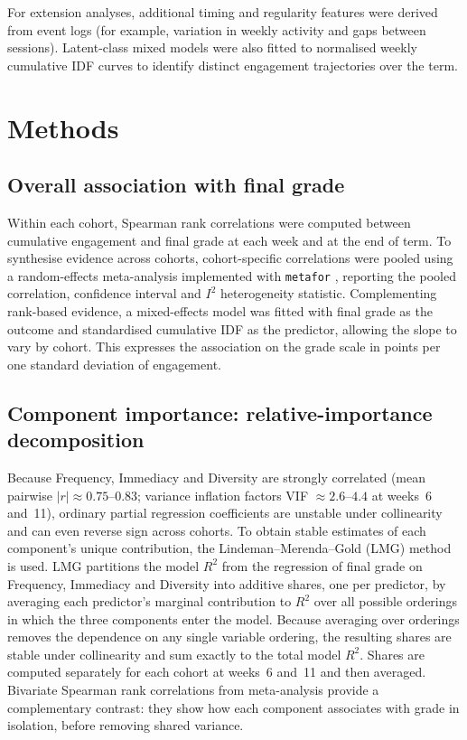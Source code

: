 \documentclass[11pt,a4paper]{article}
\begin{document}
For extension analyses, additional timing and regularity features were derived
from event logs (for example, variation in weekly activity and gaps between
sessions). Latent-class mixed models were also fitted to normalised weekly
cumulative IDF curves to identify distinct engagement trajectories over the term.

\section{Methods}

\subsection{Overall association with final grade}
Within each cohort, Spearman rank correlations were computed between cumulative
engagement and final grade at each week and at the end of term. To synthesise
evidence across cohorts, cohort-specific correlations were pooled using a
random-effects meta-analysis implemented with \texttt{metafor}
\citep{viechtbauer2010}, reporting the pooled correlation, confidence interval
and $I^2$ heterogeneity statistic. Complementing rank-based evidence, a
mixed-effects model was fitted with final grade as the outcome and standardised
cumulative IDF as the predictor, allowing the slope to vary by cohort. This
expresses the association on the grade scale in points per one standard deviation
of engagement.

\subsection{Component importance: relative-importance decomposition}
Because Frequency, Immediacy and Diversity are strongly correlated (mean pairwise
$|r| \approx 0.75$--$0.83$; variance inflation factors VIF $\approx 2.6$--$4.4$
at weeks~6 and~11), ordinary partial regression coefficients are unstable under
collinearity and can even reverse sign across cohorts. To obtain stable estimates
of each component's unique contribution, the Lindeman--Merenda--Gold (LMG) method
\citep{lindeman1980} is used. LMG partitions the model $R^2$ from the regression
of final grade on Frequency, Immediacy and Diversity into additive shares, one
per predictor, by averaging each predictor's marginal contribution to $R^2$ over
all possible orderings in which the three components enter the model. Because
averaging over orderings removes the dependence on any single variable ordering,
the resulting shares are stable under collinearity and sum exactly to the total
model $R^2$. Shares are computed separately for each cohort at weeks~6 and~11 and
then averaged. Bivariate Spearman rank correlations from meta-analysis provide a
complementary contrast: they show how each component associates with grade in
isolation, before removing shared variance.
\end{document}
